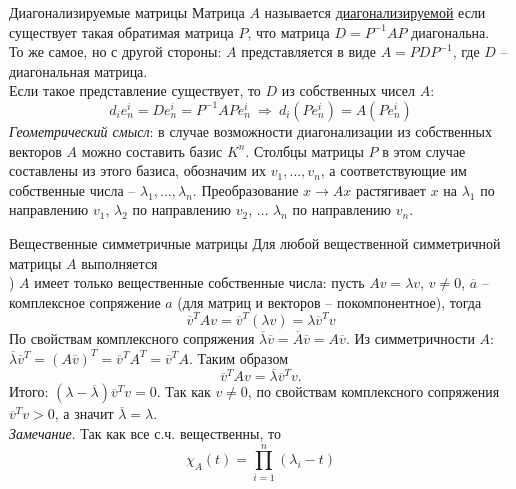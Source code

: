 \documentclass[10pt, handout]{beamer}
\begin{document}
\begin{frame}{Диагонализируемые матрицы}
Матрица $A$ называется \underline{диагонализируемой} если существует такая обратимая матрица $P$, что матрица $D=P^{-1}AP$ диагональна.\\
\pause
\vspace{1em}
То же самое, но с другой стороны: $A$ представляется в виде $A=PDP^{-1}$, где $D$ -- диагональная матрица.\\
\pause
\vspace{1em}
Если такое представление существует, то $D$ из собственных чисел $A$:
$$
d_ie_n^i=De_n^i=P^{-1}APe_n^i~\Rightarrow~d_i(Pe_n^i)=A(Pe_n^i)
$$
\pause
\textit{Геометрический смысл}: в случае возможности диагонализации из собственных векторов $A$ можно составить базис $K^n$. Столбцы матрицы $P$ в этом случае составлены из этого базиса, обозначим их $v_1, \ldots, v_n$, а соответствующие им собственные числа -- $\lambda_1, \ldots, \lambda_n$. Преобразование $x\rightarrow Ax$ растягивает $x$ на $\lambda_1$ по направлению $v_1$, $\lambda_2$ по направлению $v_2$, $\ldots$ $\lambda_n$ по направлению $v_n$. \\
\end{frame}

\begin{frame}{Вещественные симметричные матрицы}
Для любой вещественной симметричной матрицы $A$ выполняется\\
) $A$ имеет только вещественные собственные числа: пусть $Av=\lambda v$, $v\neq 0$, $\overline{a}$ -- комплексное сопряжение $a$ (для матриц и векторов -- покомпонентное), тогда
$$
\overline{v}^TAv=\overline{v}^T(\lambda v)=\lambda \overline{v}^Tv
$$
По свойствам комплексного сопряжения $\overline{\lambda}\overline{v}=\overline{A}\overline{v}=A\overline{v}$. Из симметричности $A$: $\overline{\lambda}\overline{v}^T=(A\overline{v})^T=\overline{v}^TA^T=\overline{v}^TA$. Таким образом 
$$
\overline{v}^TAv=\overline{\lambda}\overline{v}^Tv.
$$
Итого: $(\lambda-\overline{\lambda})\overline{v}^Tv=0$. Так как $v\neq 0$, по свойствам комплексного сопряжения $\overline{v}^Tv>0$, а значит $\overline{\lambda}=\lambda$.\\
\pause
\vspace{1em}
\textit{Замечание}. Так как все с.ч. вещественны, то 
$$
\chi_A(t)=\prod_{i=1}^n(\lambda_i-t)
$$
\end{frame}
\end{document}
